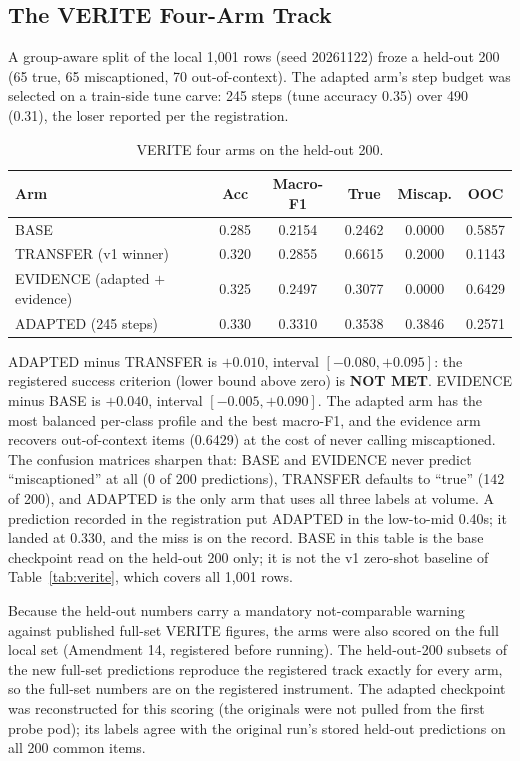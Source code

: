 \documentclass{article} %
\begin{document}
\subsection{The VERITE Four-Arm Track}
A group-aware split of the local 1,001 rows (seed 20261122) froze a held-out 200 (65 true, 65 miscaptioned, 70 out-of-context). The adapted arm's step budget was selected on a train-side tune carve: 245 steps (tune accuracy 0.35) over 490 (0.31), the loser reported per the registration.

\begin{table}[t]
\centering
\small
\caption{VERITE four arms on the held-out 200.}
\label{tab:verite4}
\begin{tabular}{lccccc}
\toprule
Arm & Acc & Macro-F1 & True & Miscap. & OOC \\
\midrule
BASE & 0.285 & 0.2154 & 0.2462 & 0.0000 & 0.5857 \\
TRANSFER (v1 winner) & 0.320 & 0.2855 & 0.6615 & 0.2000 & 0.1143 \\
EVIDENCE (adapted \(+\) evidence) & 0.325 & 0.2497 & 0.3077 & 0.0000 & 0.6429 \\
ADAPTED (245 steps) & 0.330 & 0.3310 & 0.3538 & 0.3846 & 0.2571 \\
\bottomrule
\end{tabular}
\end{table}

ADAPTED minus TRANSFER is \(+0.010\), interval \([-0.080, +0.095]\): the registered success criterion (lower bound above zero) is \textbf{NOT MET}. EVIDENCE minus BASE is \(+0.040\), interval \([-0.005, +0.090]\). The adapted arm has the most balanced per-class profile and the best macro-F1, and the evidence arm recovers out-of-context items (0.6429) at the cost of never calling miscaptioned. The confusion matrices sharpen that: BASE and EVIDENCE never predict ``miscaptioned'' at all (0 of 200 predictions), TRANSFER defaults to ``true'' (142 of 200), and ADAPTED is the only arm that uses all three labels at volume. A prediction recorded in the registration put ADAPTED in the low-to-mid 0.40s; it landed at 0.330, and the miss is on the record. BASE in this table is the base checkpoint read on the held-out 200 only; it is not the v1 zero-shot baseline of Table~\ref{tab:verite}, which covers all 1,001 rows.

Because the held-out numbers carry a mandatory not-comparable warning against published full-set VERITE figures, the arms were also scored on the full local set (Amendment 14, registered before running). The held-out-200 subsets of the new full-set predictions reproduce the registered track exactly for every arm, so the full-set numbers are on the registered instrument. The adapted checkpoint was reconstructed for this scoring (the originals were not pulled from the first probe pod); its labels agree with the original run's stored held-out predictions on all 200 common items.
\end{document}
